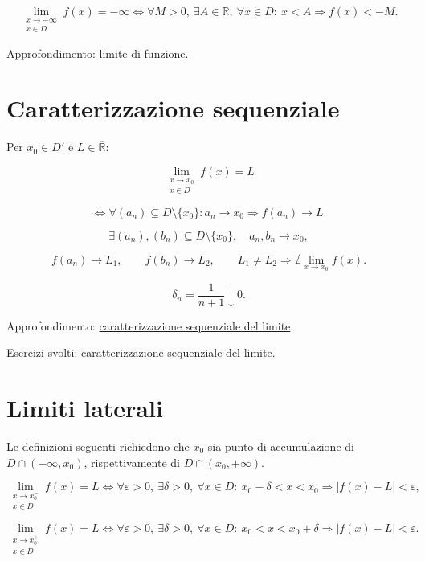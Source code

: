 \[
\lim_{\substack{x\to-\infty\\x\in D}}f(x)=-\infty
\Longleftrightarrow
\forall M>0,\ \exists A\in\mathbb R,\ \forall x\in D:\
x<A\Rightarrow f(x)<-M.
\]

Approfondimento: \href{https://ingegnerismo.it/matematica/limite-di-funzione/}{limite di funzione}.

\section{Caratterizzazione sequenziale}\label{caratterizzazione-sequenziale}

Per \(x_0\in D'\) e \(L\in\overline{\mathbb R}\):

\[
\lim_{\substack{x\to x_0\\x\in D}}f(x)=L
\]

\[
\Longleftrightarrow
\forall(a_n)\subseteq D\setminus\{x_0\}:
a_n\to x_0
\Rightarrow
f(a_n)\to L.
\]

\[
\exists(a_n),(b_n)\subseteq D\setminus\{x_0\},
\quad
a_n,b_n\to x_0,
\]

\[
f(a_n)\to L_1,
\qquad
f(b_n)\to L_2,
\qquad
L_1\ne L_2
\Longrightarrow
\nexists\lim_{x\to x_0}f(x).
\]

\[
\delta_n=\dfrac{1}{n+1}\downarrow0.
\]

Approfondimento: \href{https://ingegnerismo.it/matematica/caratterizzazione-sequenziale-del-limite/}{caratterizzazione sequenziale del limite}.

Esercizi svolti: \href{https://ingegnerismo.it/matematica/caratterizzazione-sequenziale-del-limite-esercizi/}{caratterizzazione sequenziale del limite}.

\section{Limiti laterali}\label{limiti-laterali}

Le definizioni seguenti richiedono che \(x_0\) sia punto di accumulazione di \(D\cap(-\infty,x_0)\), rispettivamente di \(D\cap(x_0,+\infty)\).

\[
\lim_{\substack{x\to x_0^-\\x\in D}}f(x)=L
\Longleftrightarrow
\forall\varepsilon>0,\ \exists\delta>0,\ \forall x\in D:\
x_0-\delta<x<x_0
\Rightarrow
|f(x)-L|<\varepsilon,
\]

\[
\lim_{\substack{x\to x_0^+\\x\in D}}f(x)=L
\Longleftrightarrow
\forall\varepsilon>0,\ \exists\delta>0,\ \forall x\in D:\
x_0<x<x_0+\delta
\Rightarrow
|f(x)-L|<\varepsilon.
\]

